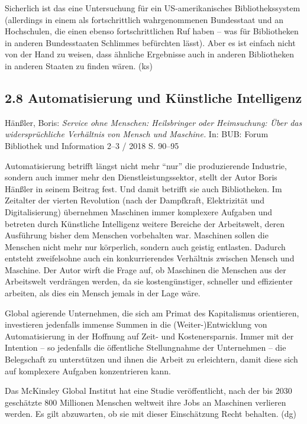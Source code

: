 \documentclass[a4paper,
fontsize=11pt,
oneside,
numbers=noperiodatend,
parskip=half-,
bibliography=totoc,
final
]{scrartcl}
\begin{document}
Sicherlich ist das eine Untersuchung für ein US-amerikanisches
Bibliothekssystem (allerdings in einem als fortschrittlich
wahrgenommenen Bundesstaat und an Hochschulen, die einen ebenso
fortschrittlichen Ruf haben -- was für Bibliotheken in anderen
Bundesstaaten Schlimmes befürchten lässt). Aber es ist einfach nicht von
der Hand zu weisen, dass ähnliche Ergebnisse auch in anderen
Bibliotheken in anderen Staaten zu finden wären. (ks)

\hypertarget{automatisierung-und-kuxfcnstliche-intelligenz}{%
\subsection{2.8 Automatisierung und Künstliche
Intelligenz}\label{automatisierung-und-kuxfcnstliche-intelligenz}}

Hänßler, Boris: \emph{Service ohne Menschen: Heilsbringer oder
Heimsuchung: Über das widersprüchliche Verhältnis von Mensch und
Maschine.} In: BUB: Forum Bibliothek und Information 2--3 / 2018 S.
90--95

Automatisierung betrifft längst nicht mehr \enquote{nur} die
produzierende Industrie, sondern auch immer mehr den
Dienstleistungssektor, stellt der Autor Boris Hänßler in seinem Beitrag
fest. Und damit betrifft sie auch Bibliotheken. Im Zeitalter der vierten
Revolution (nach der Dampfkraft, Elektrizität und Digitalisierung)
übernehmen Maschinen immer komplexere Aufgaben und betreten durch
Künstliche Intelligenz weitere Bereiche der Arbeitswelt, deren
Ausführung bisher dem Menschen vorbehalten war. Maschinen sollen die
Menschen nicht mehr nur körperlich, sondern auch geistig entlasten.
Dadurch entsteht zweifelsohne auch ein konkurrierendes Verhältnis
zwischen Mensch und Maschine. Der Autor wirft die Frage auf, ob
Maschinen die Menschen aus der Arbeitswelt verdrängen werden, da sie
kostengünstiger, schneller und effizienter arbeiten, als dies ein Mensch
jemals in der Lage wäre.

Global agierende Unternehmen, die sich am Primat des Kapitalismus
orientieren, investieren jedenfalls immense Summen in die
(Weiter-)Entwicklung von Automatisierung in der Hoffnung auf Zeit- und
Kostenersparnis. Immer mit der Intention -- so jedenfalls die
öffentliche Stellungnahme der Unternehmen -- die Belegschaft zu
unterstützen und ihnen die Arbeit zu erleichtern, damit diese sich auf
komplexere Aufgaben konzentrieren kann.

Das McKinsley Global Institut hat eine Studie veröffentlicht, nach der
bis 2030 geschätzte 800 Millionen Menschen weltweit ihre Jobs an
Maschinen verlieren werden. Es gilt abzuwarten, ob sie mit dieser
Einschätzung Recht behalten. (dg)
\end{document}
